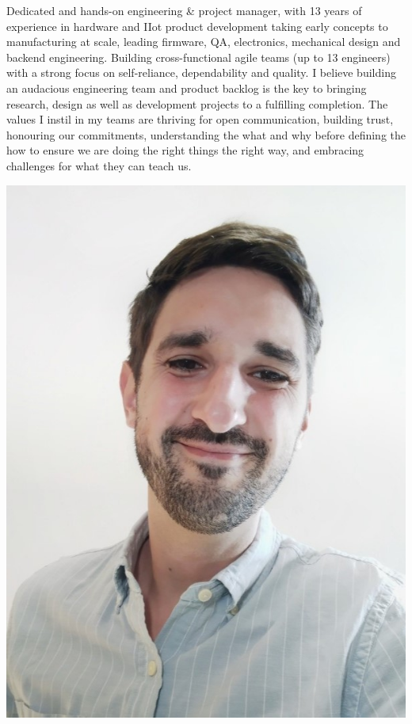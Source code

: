 \documentclass[10pt,a4paper]{moderncv}
\begin{document}
\begin{minipage}{0.8\textwidth}
    Dedicated and hands-on engineering \& project manager, with 13 years of experience in hardware and IIot product development taking early concepts to manufacturing at scale, leading firmware, QA, electronics, mechanical design and backend engineering. Building cross-functional agile teams (up to 13 engineers) with a strong focus on self-reliance, dependability and quality. I believe building an audacious engineering team and product backlog is the key to bringing research, design as well as development projects to a fulfilling completion. The values I instil in my teams are thriving for open communication, building trust, honouring our commitments, understanding the what and why before defining the how to ensure we are doing the right things the right way, and embracing challenges for what they can teach us.
\end{minipage}
\hfill
\begin{minipage}{0.17\textwidth}
    \includegraphics[width=\linewidth]{me}
    \vspace{1em}
\end{minipage}
\end{document}
